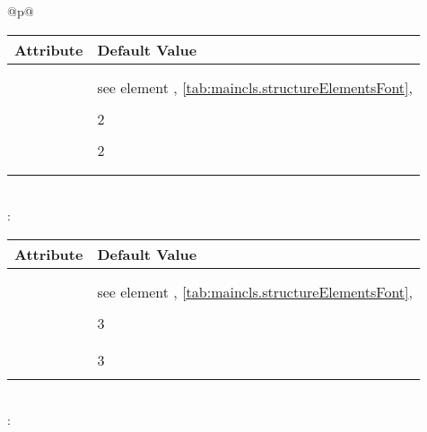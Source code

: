 \begin{longtable}{@{}p{\columnwidth}@{}}
\begin{tabularx}{\linewidth}{ll}
    \toprule
    Attribute & Default Value \\
    \midrule\nopagebreak
    \PValue{afterskip}   & \PValue{1.5ex plus .2ex} \\
    \PValue{beforeskip}  & \PValue{-3.25ex plus -1ex minus -.2ex} \\
    \PValue{font}        & see element \FontElement{subsection},
                           \autoref{tab:maincls.structureElementsFont}, 
                           \autopageref{tab:maincls.structureElementsFont} \\
    \PValue{indent}      & \PValue{0pt} \\
    \PValue{level}       & 2 \\
    \PValue{tocindent}   & \PValue{3.8em}\\
    \PValue{toclevel}    & 2 \\
    \PValue{tocnumwidth} & \PValue{3.2em}\\
    \PValue{tocstyle}    & \PValue{section} \\
    \bottomrule
    \end{tabularx} \\
    \addlinespace[\normalbaselineskip]
    : \\*
    \begin{tabularx}{\linewidth}{ll}
    \toprule
    Attribute & Default Value \\
    \midrule\nopagebreak
    \PValue{afterskip}   & \PValue{1.5ex plus .2ex} \\
    \PValue{beforeskip}  & \PValue{-3.25ex plus -1ex minus -.2ex} \\
    \PValue{font}        & see element \FontElement{subsubsection},
                           \autoref{tab:maincls.structureElementsFont}, 
                           \autopageref{tab:maincls.structureElementsFont} \\
    \PValue{indent}      & \PValue{0pt} \\
    \PValue{level}       & 3 \\
    \PValue{tocindent}   & \PValue{7.0em}\\
    \PValue{tocnumwidth} & \PValue{4.1em}\\
    \PValue{toclevel}    & 3 \\
    \PValue{tocstyle}    & \PValue{section} \\
    \bottomrule
    \end{tabularx} \\
    \addlinespace[\normalbaselineskip]
    : \\*

\end{longtable}
